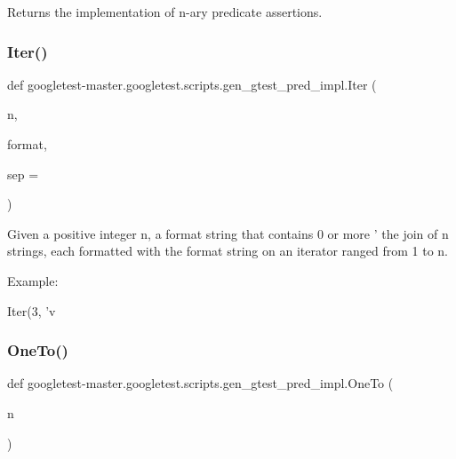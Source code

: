\begin{DoxyVerb}Returns the implementation of n-ary predicate assertions.\end{DoxyVerb}
 \mbox{\label{namespacegoogletest-master_1_1googletest_1_1scripts_1_1gen__gtest__pred__impl_a62e453d3ebe1044e73975720b0cebea3}} 
\subsubsection{\texorpdfstring{Iter()}{Iter()}}
{\footnotesize\ttfamily def googletest-\/master.\+googletest.\+scripts.\+gen\+\_\+gtest\+\_\+pred\+\_\+impl.\+Iter (\begin{DoxyParamCaption}\item[{}]{n,  }\item[{}]{format,  }\item[{}]{sep = {\ttfamily \textquotesingle{}\textquotesingle{}} }\end{DoxyParamCaption})}

\begin{DoxyVerb}Given a positive integer n, a format string that contains 0 or
more '%
the join of n strings, each formatted with the format string on an
iterator ranged from 1 to n.

Example:

Iter(3, 'v%
\end{DoxyVerb}
 \mbox{\label{namespacegoogletest-master_1_1googletest_1_1scripts_1_1gen__gtest__pred__impl_a840f7cde355a64a957439f38793fbdff}} 
\subsubsection{\texorpdfstring{OneTo()}{OneTo()}}
{\footnotesize\ttfamily def googletest-\/master.\+googletest.\+scripts.\+gen\+\_\+gtest\+\_\+pred\+\_\+impl.\+One\+To (\begin{DoxyParamCaption}\item[{}]{n }\end{DoxyParamCaption})}

